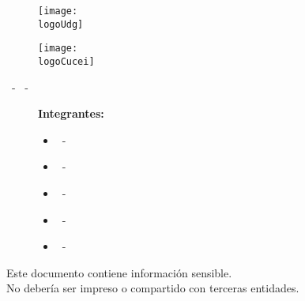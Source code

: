 



    \begin{titlepage}
        \centering
        {\huge\textbf{\universidad}}\par
        \vspace{0.6cm}
        {\LARGE{\cede}}
        \vfill

        \begin{figure}[h]
            \begin{minipage}[t]{0.45\textwidth}
                \centering
                \texttt{[image: \\logoUdg]}
            \end{minipage}
            \hfill
            \begin{minipage}[t]{0.45\textwidth}
                \centering
                \texttt{[image: \\logoCucei]}
            \end{minipage}
        \end{figure}
        \vfill

        \Large{ \division\vfill \textbf{\carrera}\vfill \textbf{\materia}\par\vspace{3pt} \seccion\ - \clave\ - \nrc\vfill }

        {\LARGE{\textbf{\theTitle}}}
        \vfill

	\begin{figure}[h]
		\centering
		\begin{minipage}[t]{0.75\textwidth}
			{\Large
				\textbf{Integrantes:}\par\vspace{8pt}
				\begin{itemize}
					\item \bAuthor\ - \bAuthorCode
					\item \cAuthor\ - \cAuthorCode
					\item \dAuthor\ - \dAuthorCode
					\item \eAuthor\ - \eAuthorCode
					\item \theAuthor\ - \theAuthorCode
				\end{itemize}
			}
		\end{minipage}
	\end{figure}\vfill


        \begin{tcolorbox}
            [colback=red!5!white, colframe=red!75!black]
            \centering
            Este documento contiene información sensible.\\
			No debería ser impreso o compartido con terceras entidades.
        \end{tcolorbox}
        \vfill
        {\large \startDate}\par
    \end{titlepage}

